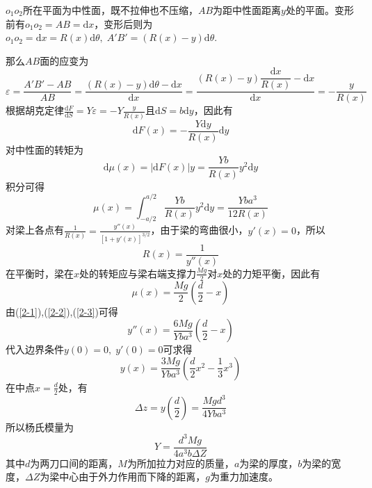 \documentclass[UTF8]{article}
\theoremstyle{MyLineTheoremStyle} %
\theoremstyle{MyBlockTheoremStyle} %
\theoremstyle{MySubsubsectionStyle} %
\begin{document}
$ o_1o_2 $所在平面为中性面，既不拉伸也不压缩，$ AB $为距中性面距离$ y $处的平面。变形前有$ o_1o_2=AB=\mathrm{d} x $，变形后则为$ o_1o_2=\mathrm{d} x=R(x)\mathrm{d}\theta,\;A'B'=(R(x)-y)\mathrm{d}\theta $.

那么$ AB $面的应变为
\begin{equation}
\varepsilon=\frac{A'B'-AB}{AB}=\frac{(R(x)-y)\mathrm{d}\theta-\mathrm{d} x}{\mathrm{d} x}=\frac{(R(x)-y)\dfrac{\mathrm{d} x}{R(x)}-\mathrm{d} x}{\mathrm{d} x}=-\frac{y}{R(x)}
\end{equation}
根据胡克定律$ \frac{\mathrm{d} F}{\mathrm{d} S}=Y\varepsilon=-Y\frac{y}{R(x)} $且$ \mathrm{d} S=b\mathrm{d} y $，因此有
\begin{equation}
\mathrm{d} F(x)=-\frac{Y\mathrm{d} y}{R(x)}\mathrm{d} y
\end{equation}
对中性面的转矩为
\begin{equation}\label{2-1}
    \mathrm{d}\mu(x)=|\mathrm{d} F(x)|y=\frac{Yb}{R(x)}y^2\mathrm{d} y
\end{equation}
积分可得
\begin{equation}
\mu(x)=\int_{-a/2}^{a/2}\frac{Yb}{R(x)}y^2\mathrm{d} y=\frac{Yba^3}{12R(x)}
\end{equation}
对梁上各点有$ \frac{1}{R(x)}=\frac{y''(x)}{[1+y'(x)]^{3/2}} $，由于梁的弯曲很小，$ y'(x)=0 $，所以
\begin{equation}\label{2-2}
    R(x)=\frac{1}{y''(x)}
\end{equation}
在平衡时，梁在$ x $处的转矩应与梁右端支撑力$ \frac{Mg}{2} $对$ x $处的力矩平衡，因此有
\begin{equation}\label{2-3}
    \mu(x)=\frac{Mg}{2}\left(\frac d2-x\right)
\end{equation}
由(\ref{2-1}),(\ref{2-2}),(\ref{2-3})可得
\begin{equation}
y''(x)=\frac{6Mg}{Yba^3}\left(\frac d2-x\right)
\end{equation}
代入边界条件$ y(0)=0,\;y'(0)=0 $可求得
\begin{equation}
y(x)=\frac{3Mg}{Yba^3}\left(\frac d2x^2-\frac13x^3\right)
\end{equation}
在中点$ x=\frac d2 $处，有
\begin{equation}
\Delta z=y\left(\frac d2\right)=\frac{Mgd^3}{4Yba^3}
\end{equation}
所以杨氏模量为
\begin{equation}\label{2}
    Y=\frac{d^3Mg}{4a^3b\Delta Z}
\end{equation}
其中$ d $为两刀口间的距离，$ M $为所加拉力对应的质量，$ a $为梁的厚度，$ b $为梁的宽度，$ \Delta Z $为梁中心由于外力作用而下降的距离，$ g $为重力加速度。
\end{document}
